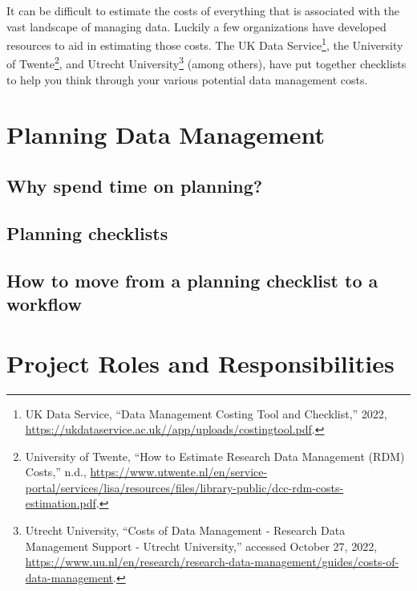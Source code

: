 \documentclass[
]{book}
\begin{document}
It can be difficult to estimate the costs of everything that is associated with the vast landscape of managing data. Luckily a few organizations have developed resources to aid in estimating those costs. The UK Data Service\footnote{UK Data Service, {``Data Management Costing Tool and Checklist,''} 2022, \url{https://ukdataservice.ac.uk//app/uploads/costingtool.pdf}.}, the University of Twente\footnote{University of Twente, {``How to Estimate Research Data Management ({RDM}) Costs,''} n.d., \url{https://www.utwente.nl/en/service-portal/services/lisa/resources/files/library-public/dcc-rdm-costs-estimation.pdf}.}, and Utrecht University\footnote{Utrecht University, {``Costs of Data Management - Research Data Management Support - Utrecht University,''} accessed October 27, 2022, \url{https://www.uu.nl/en/research/research-data-management/guides/costs-of-data-management}.} (among others), have put together checklists to help you think through your various potential data management costs.

\hypertarget{planning-data-management}{%
\chapter{Planning Data Management}\label{planning-data-management}}

\hypertarget{why-spend-time-on-planning}{%
\section{Why spend time on planning?}\label{why-spend-time-on-planning}}

\hypertarget{planning-checklists}{%
\section{Planning checklists}\label{planning-checklists}}

\hypertarget{how-to-move-from-a-planning-checklist-to-a-workflow}{%
\section{How to move from a planning checklist to a workflow}\label{how-to-move-from-a-planning-checklist-to-a-workflow}}

\hypertarget{project-roles-and-responsibilities}{%
\chapter{Project Roles and Responsibilities}\label{project-roles-and-responsibilities}}
\end{document}
